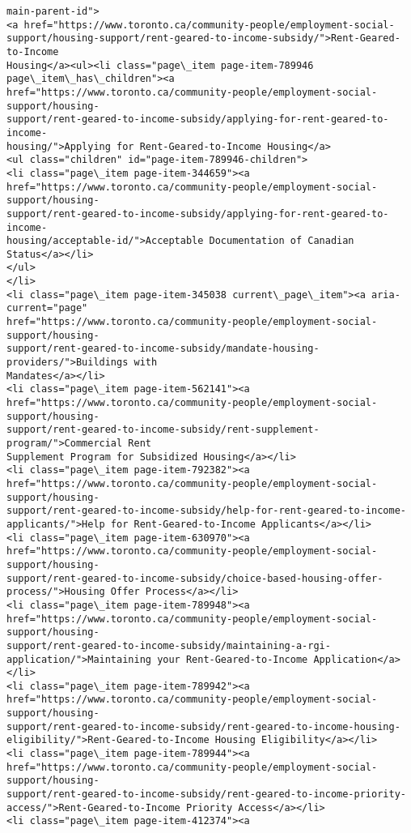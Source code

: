 \documentclass[11pt]{article}
\begin{document}
\begin{Verbatim}[commandchars=\\\{\}]
main-parent-id">
<a href="https://www.toronto.ca/community-people/employment-social-
support/housing-support/rent-geared-to-income-subsidy/">Rent-Geared-to-Income
Housing</a><ul><li class="page\_item page-item-789946 page\_item\_has\_children"><a
href="https://www.toronto.ca/community-people/employment-social-support/housing-
support/rent-geared-to-income-subsidy/applying-for-rent-geared-to-income-
housing/">Applying for Rent-Geared-to-Income Housing</a>
<ul class="children" id="page-item-789946-children">
<li class="page\_item page-item-344659"><a
href="https://www.toronto.ca/community-people/employment-social-support/housing-
support/rent-geared-to-income-subsidy/applying-for-rent-geared-to-income-
housing/acceptable-id/">Acceptable Documentation of Canadian Status</a></li>
</ul>
</li>
<li class="page\_item page-item-345038 current\_page\_item"><a aria-current="page"
href="https://www.toronto.ca/community-people/employment-social-support/housing-
support/rent-geared-to-income-subsidy/mandate-housing-providers/">Buildings with
Mandates</a></li>
<li class="page\_item page-item-562141"><a
href="https://www.toronto.ca/community-people/employment-social-support/housing-
support/rent-geared-to-income-subsidy/rent-supplement-program/">Commercial Rent
Supplement Program for Subsidized Housing</a></li>
<li class="page\_item page-item-792382"><a
href="https://www.toronto.ca/community-people/employment-social-support/housing-
support/rent-geared-to-income-subsidy/help-for-rent-geared-to-income-
applicants/">Help for Rent-Geared-to-Income Applicants</a></li>
<li class="page\_item page-item-630970"><a
href="https://www.toronto.ca/community-people/employment-social-support/housing-
support/rent-geared-to-income-subsidy/choice-based-housing-offer-
process/">Housing Offer Process</a></li>
<li class="page\_item page-item-789948"><a
href="https://www.toronto.ca/community-people/employment-social-support/housing-
support/rent-geared-to-income-subsidy/maintaining-a-rgi-
application/">Maintaining your Rent-Geared-to-Income Application</a></li>
<li class="page\_item page-item-789942"><a
href="https://www.toronto.ca/community-people/employment-social-support/housing-
support/rent-geared-to-income-subsidy/rent-geared-to-income-housing-
eligibility/">Rent-Geared-to-Income Housing Eligibility</a></li>
<li class="page\_item page-item-789944"><a
href="https://www.toronto.ca/community-people/employment-social-support/housing-
support/rent-geared-to-income-subsidy/rent-geared-to-income-priority-
access/">Rent-Geared-to-Income Priority Access</a></li>
<li class="page\_item page-item-412374"><a

\end{Verbatim}
\end{document}
